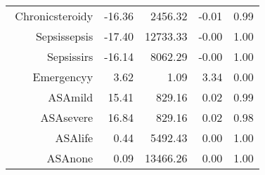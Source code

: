 \begin{tabular}{rrrrr}
$$  Chronic\-steroid\-y & -16.36 & 2456.32 & -0.01 & 0.99 \\ 
  Sepsis\-sepsis & -17.40 & 12733.33 & -0.00 & 1.00 \\ 
  Sepsis\-sirs & -16.14 & 8062.29 & -0.00 & 1.00 \\ 
  Emergency\-y & 3.62 & 1.09 & 3.34 & 0.00 \\ 
  ASA\-mild & 15.41 & 829.16 & 0.02 & 0.99 \\ 
  ASA\-severe & 16.84 & 829.16 & 0.02 & 0.98 \\ 
  ASA\-life & 0.44 & 5492.43 & 0.00 & 1.00 \\ 
  ASA\-none & 0.09 & 13466.26 & 0.00 & 1.00 \\ 
   \hline
\end{tabular}

